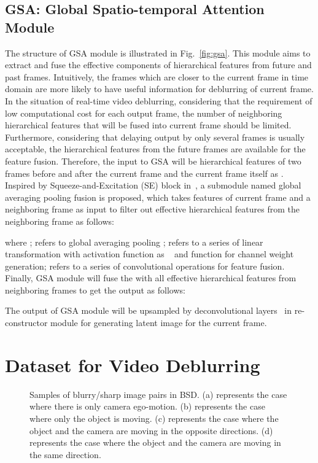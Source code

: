 \documentclass[twocolumn]{svjour3}          \smartqed  \usepackage{graphicx}
\begin{document}
\subsection{GSA: Global Spatio-temporal Attention Module}
\label{sec:GSA}

The structure of GSA module is illustrated in Fig.~\ref{fig:gsa}. This module aims to extract and fuse the effective components of hierarchical features from future and past frames. Intuitively, the frames which are closer to the current frame in time domain are more likely to have useful information for deblurring of current frame. In the situation of real-time video deblurring, considering that the requirement of low computational cost for each output frame, the number of neighboring hierarchical features that will be fused into current frame should be limited. Furthermore, considering that delaying output by only several frames is usually acceptable, the hierarchical features from the future frames are available for the feature fusion. Therefore, the input to GSA will be hierarchical features of two frames before and after the current frame and the current frame itself as . Inspired by Squeeze-and-Excitation (SE) block in~\cite{hu2018squeeze}, a submodule named global averaging pooling fusion is proposed, which takes features of current frame and a neighboring frame as input to filter out effective hierarchical features  from the neighboring frame as follows:

where ;  refers to global averaging pooling \cite{lin2013network};  refers to a series of linear transformation with activation function as ~\cite{nair2010rectified} and  function for channel weight generation;  refers to a series of  convolutional operations for feature fusion. Finally, GSA module will fuse the  with all effective hierarchical features from neighboring frames to get the output  as follows:

The output  of GSA module will be upsampled by deconvolutional layers~\cite{dumoulin2016guide} in re-constructor module for generating latent image for the current frame.

\section{Dataset for Video Deblurring}

\begin{figure*}[!ht]
	\centering
{}
	\hfil
	\hfil
	\hfil
	\caption{Samples of blurry/sharp image pairs in BSD. (a) represents the case where there is only camera ego-motion. (b) represents the case where only the object is moving. (c) represents the case where the object and the camera are moving in the opposite directions. (d) represents the case where the object and the camera are moving in the same direction.}
	\label{fig:samples}
\end{figure*}
\end{document}
